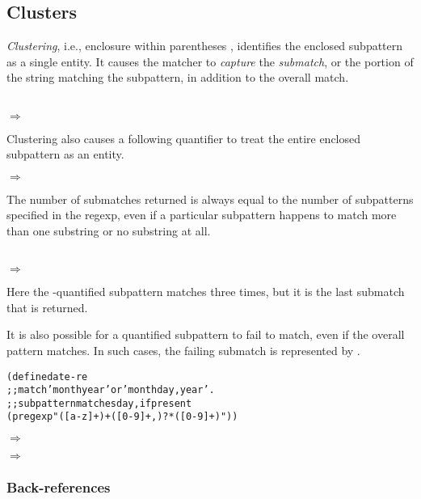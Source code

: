 \subsection {Clusters}

\emph{Clustering}, i.e., enclosure within parentheses
\code{(}\etc\code{)}, identifies the enclosed subpattern as a single
entity.  It causes the matcher to \emph{capture} the \emph{submatch},
or the portion of the string matching the subpattern, in addition to
the overall match.

 \\
$\Rightarrow$ 

Clustering also causes a following quantifier to treat the entire
enclosed subpattern as an entity.

 $\Rightarrow$

The number of submatches returned is always equal to the number of
subpatterns specified in the regexp, even if a particular subpattern
happens to match more than one substring or no substring at all.

 \\
$\Rightarrow$ 

Here the \code{*}-quantified subpattern matches three times, but it is
the last submatch that is returned.

It is also possible for a quantified subpattern to fail to match, even
if the overall pattern matches.  In such cases, the failing submatch
is represented by .

\begin{alltt}
(define date-re
  ;; match 'month year' or 'month day, year'.
  ;; subpattern matches day, if present
  (pregexp "([a-z]+) +([0-9]+,)? *([0-9]+)"))
\end{alltt}

 $\Rightarrow$

 $\Rightarrow$

\subsubsection {Back-references}\label{sec:pregexp-back-references}

